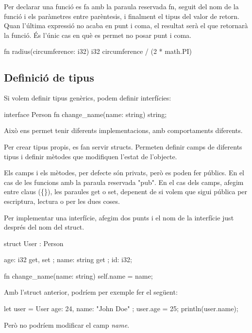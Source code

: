 ﻿\documentclass{article}
\begin{document}
Per declarar una funció es fa amb la paraula reservada fn, seguit del nom de la
funció i els paràmetres entre parèntesis, i finalment el tipus del valor de retorn.
Quan l'última expressió no acaba en punt i coma, el resultat serà el que retornarà
la funció. És l'únic cas en què es permet no posar punt i coma.

\begin{code}
fn radius(circumference: i32) i32 {
    circumference / (2 * math.PI)
}
\end{code}

\subsection{Definició de tipus}

Si volem definir tipus genèrics, podem definir interfícies:

\begin{code}
interface Person {
    fn change_name(name: string) string;
}
\end{code}

Això ens permet tenir diferents implementacions, amb comportaments diferents.

Per crear tipus propis, es fan servir structs. Permeten definir camps de diferents
tipus i definir mètodes que modifiquen l'estat de l'objecte.

Els camps i els mètodes, per defecte són privats, però es poden fer públics.
En el cas de les funcions amb la paraula reservada "pub". En el cas dels camps,
afegim entre claus (\{\}), les paraules get o set, depenent de si volem que sigui pública
per escriptura, lectura o per les dues coses.

Per implementar una interfície, afegim dos punts i el nom de la interfície just
després del nom del struct.

\begin{code}
struct User : Person {
    age: i32 { get, set };
    name: string { get };
    id: i32;

    fn change_name(name: string) {
        self.name = name;
    }
}
\end{code}

Amb l'struct anterior, podríem per exemple fer el següent:

\begin{code}
let user = User { age: 24, name: "John Doe" };
user.age = 25;
println(user.name);
\end{code}

Però no podríem modificar el camp \textit{name}.
\end{document}
